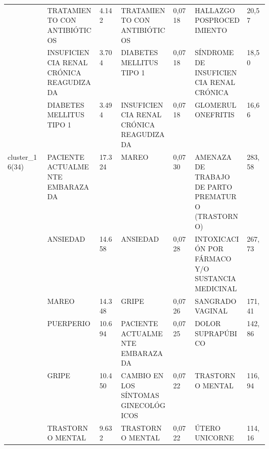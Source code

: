 \begin{landscape}
\begin{longtable}[c]{@{}lp{0.2\linewidth}lp{0.2\linewidth}lp{0.2\linewidth}l@{}}
                                  & TRATAMIENTO CON ANTIBIÓTICOS                                  & 4.142  & TRATAMIENTO CON ANTIBIÓTICOS                           & 0,0718 & HALLAZGO POSPROCEDIMIENTO                                     & 20,57    \\
                                  & INSUFICIENCIA RENAL CRÓNICA REAGUDIZADA                       & 3.704  & DIABETES MELLITUS TIPO 1                               & 0,0718 & SÍNDROME DE INSUFICIENCIA RENAL CRÓNICA                       & 18,50    \\
                                  & DIABETES MELLITUS TIPO 1                                      & 3.494  & INSUFICIENCIA RENAL CRÓNICA REAGUDIZADA                & 0,0718 & GLOMERULONEFRITIS                                             & 16,66    \\
\multirow{10}{*}{cluster\_16(34)} & PACIENTE ACTUALMENTE EMBARAZADA                               & 17.324 & MAREO                                                  & 0,0730 & AMENAZA DE TRABAJO DE PARTO PREMATURO (TRASTORNO)             & 283,58   \\
                                  & ANSIEDAD                                                      & 14.658 & ANSIEDAD                                               & 0,0728 & INTOXICACIÓN POR FÁRMACO Y/O SUSTANCIA MEDICINAL              & 267,73   \\
                                  & MAREO                                                         & 14.348 & GRIPE                                                  & 0,0726 & SANGRADO VAGINAL                                              & 171,41   \\
                                  & PUERPERIO                                                     & 10.694 & PACIENTE ACTUALMENTE EMBARAZADA                        & 0,0725 & DOLOR SUPRAPÚBICO                                             & 142,86   \\
                                  & GRIPE                                                         & 10.450 & CAMBIO EN LOS SÍNTOMAS GINECOLÓGICOS                   & 0,0722 & TRASTORNO MENTAL                                              & 116,94   \\
                                  & TRASTORNO MENTAL                                              & 9.632  & TRASTORNO MENTAL                                       & 0,0722 & ÚTERO UNICORNE                                                & 114,16   \\

\end{longtable}
\end{landscape}
